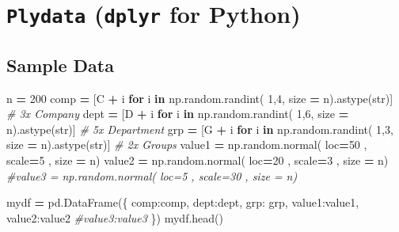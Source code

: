 \documentclass[
]{book}
\newenvironment{Shaded}{\begin{snugshade}}{\end{snugshade}}
\newcommand{\BuiltInTok}[1]{#1}
\newcommand{\CommentTok}[1]{\textcolor[rgb]{0.37,0.37,0.37}{\textit{#1}}}
\newcommand{\ControlFlowTok}[1]{\textcolor[rgb]{0.27,0.27,0.27}{\textbf{#1}}}
\newcommand{\DecValTok}[1]{\textcolor[rgb]{0.06,0.06,0.06}{#1}}
\newcommand{\KeywordTok}[1]{\textcolor[rgb]{0.27,0.27,0.27}{\textbf{#1}}}
\newcommand{\NormalTok}[1]{#1}
\newcommand{\OperatorTok}[1]{\textcolor[rgb]{0.43,0.43,0.43}{\textbf{#1}}}
\newcommand{\StringTok}[1]{\textcolor[rgb]{0.5,0.5,0.5}{#1}}
\begin{document}
\hypertarget{plydata-dplyr-for-python}{%
\chapter{\texorpdfstring{\texttt{Plydata} (\texttt{dplyr} for Python)}{Plydata (dplyr for Python)}}\label{plydata-dplyr-for-python}}

\hypertarget{sample-data}{%
\section{Sample Data}\label{sample-data}}

\begin{Shaded}
\begin{Highlighting}[]
\NormalTok{n }\OperatorTok{=} \DecValTok{200}
\NormalTok{comp }\OperatorTok{=}\NormalTok{ [}\StringTok{\textquotesingle{}C\textquotesingle{}} \OperatorTok{+}\NormalTok{ i }\ControlFlowTok{for}\NormalTok{ i }\KeywordTok{in}\NormalTok{ np.random.randint( }\DecValTok{1}\NormalTok{,}\DecValTok{4}\NormalTok{, size  }\OperatorTok{=}\NormalTok{ n).astype(}\BuiltInTok{str}\NormalTok{)] }\CommentTok{\# 3x Company}
\NormalTok{dept }\OperatorTok{=}\NormalTok{ [}\StringTok{\textquotesingle{}D\textquotesingle{}} \OperatorTok{+}\NormalTok{ i }\ControlFlowTok{for}\NormalTok{ i }\KeywordTok{in}\NormalTok{ np.random.randint( }\DecValTok{1}\NormalTok{,}\DecValTok{6}\NormalTok{, size  }\OperatorTok{=}\NormalTok{ n).astype(}\BuiltInTok{str}\NormalTok{)] }\CommentTok{\# 5x Department}
\NormalTok{grp }\OperatorTok{=}\NormalTok{  [}\StringTok{\textquotesingle{}G\textquotesingle{}} \OperatorTok{+}\NormalTok{ i }\ControlFlowTok{for}\NormalTok{ i }\KeywordTok{in}\NormalTok{ np.random.randint( }\DecValTok{1}\NormalTok{,}\DecValTok{3}\NormalTok{, size  }\OperatorTok{=}\NormalTok{ n).astype(}\BuiltInTok{str}\NormalTok{)] }\CommentTok{\# 2x Groups}
\NormalTok{value1 }\OperatorTok{=}\NormalTok{ np.random.normal( loc}\OperatorTok{=}\DecValTok{50}\NormalTok{ , scale}\OperatorTok{=}\DecValTok{5}\NormalTok{ , size }\OperatorTok{=}\NormalTok{ n)}
\NormalTok{value2 }\OperatorTok{=}\NormalTok{ np.random.normal( loc}\OperatorTok{=}\DecValTok{20}\NormalTok{ , scale}\OperatorTok{=}\DecValTok{3}\NormalTok{ , size }\OperatorTok{=}\NormalTok{ n)}
\CommentTok{\#value3 = np.random.normal( loc=5 , scale=30 , size = n)}

\NormalTok{mydf }\OperatorTok{=}\NormalTok{ pd.DataFrame(\{}
    \StringTok{\textquotesingle{}comp\textquotesingle{}}\NormalTok{:comp, }
    \StringTok{\textquotesingle{}dept\textquotesingle{}}\NormalTok{:dept, }
    \StringTok{\textquotesingle{}grp\textquotesingle{}}\NormalTok{: grp,}
    \StringTok{\textquotesingle{}value1\textquotesingle{}}\NormalTok{:value1, }
    \StringTok{\textquotesingle{}value2\textquotesingle{}}\NormalTok{:value2}
    \CommentTok{\#\textquotesingle{}value3\textquotesingle{}:value3 }
\NormalTok{\})}
\NormalTok{mydf.head()}
\end{Highlighting}
\end{Shaded}
\end{document}
